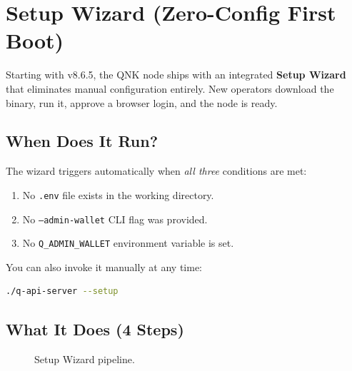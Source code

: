 \documentclass[11pt,a4paper]{article}
\begin{document}
\section{Setup Wizard (Zero-Config First Boot)}
\label{sec:setup-wizard}

Starting with v8.6.5, the QNK node ships with an integrated \textbf{Setup Wizard}
that eliminates manual configuration entirely. New operators download the binary,
run it, approve a browser login, and the node is ready.

\subsection{When Does It Run?}

The wizard triggers automatically when \emph{all three} conditions are met:
\begin{enumerate}[nosep]
    \item No \texttt{.env} file exists in the working directory.
    \item No \texttt{--admin-wallet} CLI flag was provided.
    \item No \texttt{Q\_ADMIN\_WALLET} environment variable is set.
\end{enumerate}

You can also invoke it manually at any time:
\begin{lstlisting}[language=bash]
./q-api-server --setup
\end{lstlisting}

\subsection{What It Does (4 Steps)}

\begin{figure}[H]
\centering
{}
\caption{Setup Wizard pipeline.}
\end{figure}
\end{document}
